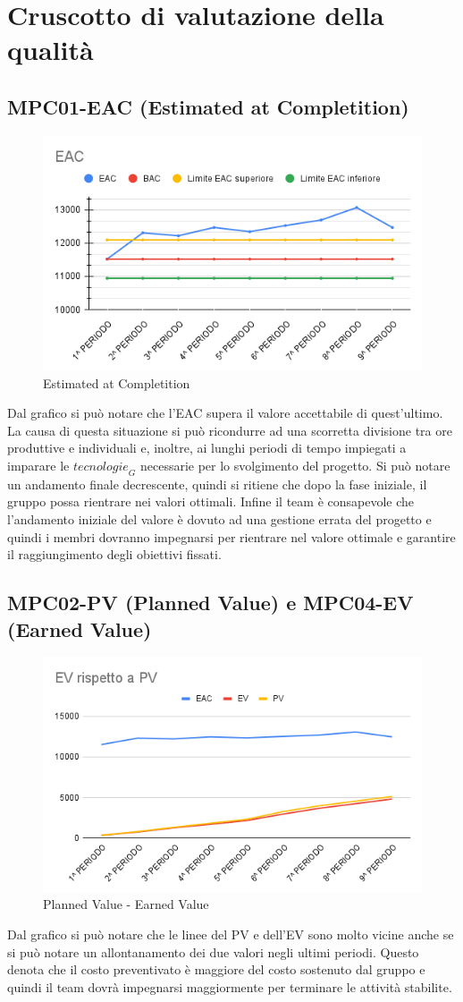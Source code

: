 \section{Cruscotto di valutazione della qualità}
\subsection{MPC01-EAC (Estimated at Completition)}
\begin{figure}[H]
  \centering
  \includegraphics[width=0.7\linewidth]{grafici/EAC.png}
  \caption{Estimated at Completition}
\end{figure}
Dal grafico si può notare che l'EAC supera il valore accettabile di quest'ultimo. La causa di questa situazione si può ricondurre ad una scorretta divisione tra ore produttive e individuali e, inoltre, ai lunghi periodi di tempo impiegati a imparare le $\textit{tecnologie}_G$ necessarie per lo svolgimento del progetto. Si può notare un andamento finale decrescente, quindi si ritiene che dopo la fase iniziale, il gruppo possa rientrare nei valori ottimali. Infine il team è consapevole che l'andamento iniziale del valore è dovuto ad una gestione errata del progetto e quindi i membri dovranno impegnarsi per rientrare nel valore ottimale e garantire il raggiungimento degli obiettivi fissati.

\subsection{MPC02-PV (Planned Value) e MPC04-EV (Earned Value)}
\begin{figure}[H]
  \centering
  \includegraphics[width=0.7\linewidth]{grafici/EV_PV.png}
  \caption{Planned Value - Earned Value}
\end{figure}
Dal grafico si può notare che le linee del PV e dell'EV sono molto vicine anche se si può notare un allontanamento dei due valori negli ultimi periodi. Questo denota che il costo preventivato è maggiore del costo sostenuto dal gruppo e quindi il team dovrà impegnarsi maggiormente per terminare le attività stabilite.
